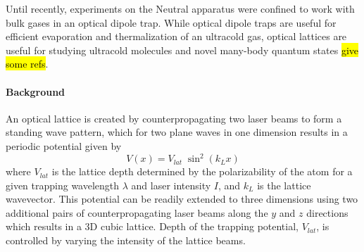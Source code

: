 Until recently, experiments on the Neutral apparatus were confined to work with bulk gases in an optical dipole trap.
While optical dipole traps are useful for efficient evaporation and thermalization of an ultracold gas, optical lattices are useful for studying ultracold molecules and novel many-body quantum states \hl{give some refs}.

\paragraph{Background} \label{sec:latBackground}
An optical lattice is created by counterpropagating two laser beams to form a standing wave pattern, which for two plane waves in one dimension results in a periodic potential given by 
	\begin{equation}
		 V(x) = V_{lat} \; \sin^2(k_L x)
	\end{equation}
where $V_{lat}$ is the lattice depth determined by the polarizability of the atom for a given trapping wavelength $\lambda$ and laser intensity $I$, and $k_L$ is the lattice wavevector.
This potential can be readily extended to three dimensions using two additional pairs of counterpropagating laser beams along the $y$ and $z$ directions which results in a 3D cubic lattice.
Depth of the trapping potential, $V_{lat}$, is controlled by varying the intensity of the lattice beams.

